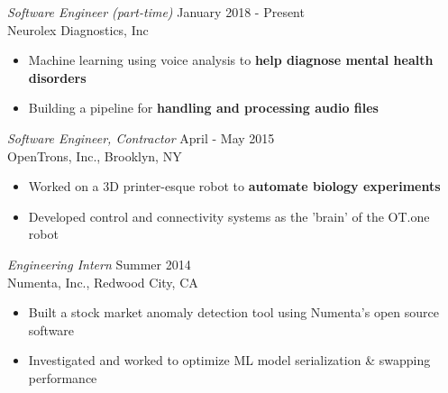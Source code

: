 \documentclass[margin,4pt]{res} %
\begin{document}
\begin{resume}
	{\sl Software Engineer (part-time)} \hfill January 2018 - Present\\
		Neurolex Diagnostics, Inc
		\begin{itemize} \itemsep -2pt
		\item Machine learning using voice analysis to  \textbf{help diagnose mental health disorders}
		\item Building a pipeline for  \textbf{handling and processing audio files}
		\end{itemize}


	{\sl Software Engineer, Contractor} \hfill April - May 2015\\
		OpenTrons, Inc., Brooklyn, NY
		\begin{itemize} \itemsep -2pt
		\item Worked on a 3D printer-esque robot to  \textbf{automate biology experiments}
		\item Developed control and connectivity systems as the 'brain' of the OT.one robot
		\end{itemize}

	
	{\sl Engineering Intern} \hfill Summer 2014\\
          Numenta, Inc., Redwood City, CA
		\begin{itemize} \itemsep -2pt
		\item Built a stock market anomaly detection tool using Numenta's open source software
		\item Investigated and worked to optimize ML model serialization \& swapping performance
		\end{itemize}


\end{resume}
\end{document}
